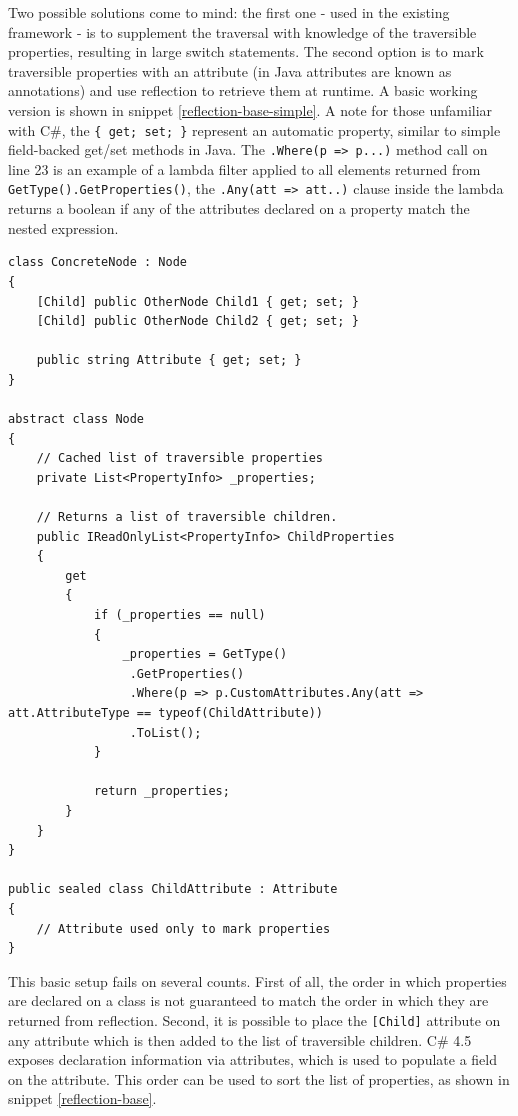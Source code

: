 \documentclass[twoside,openright]{uva-bachelor-thesis}
\newcommand{\code}[1]{\texttt{\footnotesize#1}}
\begin{document}
		Two possible solutions come to mind: the first one - used in the existing framework - is to supplement the traversal with knowledge of the traversible properties, resulting in large switch statements. The second option is to mark traversible properties with an attribute (in Java attributes are known as annotations) and use reflection to retrieve them at runtime. A basic working version is shown in snippet \ref{reflection-base-simple}. A note for those unfamiliar with C\#, the \code{\{ get; set; \}} represent an automatic property, similar to simple field-backed get/set methods in Java. The \code{.Where(p => p...)} method call on line 23 is an example of a lambda filter applied to all elements returned from \code{GetType().GetProperties()}, the \code{.Any(att => att..)} clause inside the lambda returns a boolean if any of the attributes declared on a property match the nested expression.
			
		\begin{lstlisting}[caption=Using reflection to retrieve marked properties from a derived class,label=reflection-base-simple]
class ConcreteNode : Node
{
	[Child] public OtherNode Child1 { get; set; }
	[Child] public OtherNode Child2 { get; set; }
	
	public string Attribute { get; set; }
}

abstract class Node
{
	// Cached list of traversible properties
	private List<PropertyInfo> _properties;
	
	// Returns a list of traversible children.
	public IReadOnlyList<PropertyInfo> ChildProperties
	{
		get
		{
			if (_properties == null)
			{
				_properties = GetType()
				 .GetProperties()
				 .Where(p => p.CustomAttributes.Any(att => att.AttributeType == typeof(ChildAttribute))
				 .ToList();
			}
			
			return _properties;
		}
	}
}

public sealed class ChildAttribute : Attribute
{
	// Attribute used only to mark properties
}
		\end{lstlisting}
			
		This basic setup fails on several counts. First of all, the order in which properties are declared on a class is not guaranteed to match the order in which they are returned from reflection. Second, it is possible to place the \code{[Child]} attribute on any attribute which is then added to the list of traversible children. C\# 4.5 exposes declaration information via attributes, which is used to populate a field on the attribute. This order can be used to sort the list of properties, as shown in snippet \ref{reflection-base}.
									
\end{document}
